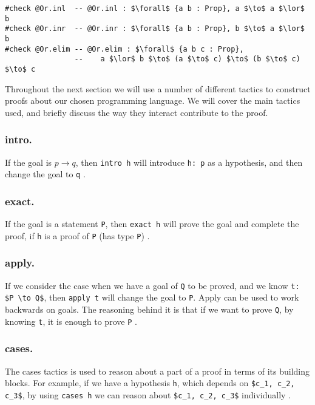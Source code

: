 \documentclass[runningheads]{llncs}
\newcommand{\cc}{\lstinline[mathescape]}
\begin{document}
\begin{lstlisting}[mathescape,
    caption={Useful definitions to better understand examples \ref{lst:or_elim}
    and \ref{lst:or_elim_tactic}.}]
#check @Or.inl  -- @Or.inl : $\forall$ {a b : Prop}, a $\to$ a $\lor$ b
#check @Or.inr  -- @Or.inr : $\forall$ {a b : Prop}, b $\to$ a $\lor$ b
#check @Or.elim -- @Or.elim : $\forall$ {a b c : Prop}, 
                --    a $\lor$ b $\to$ (a $\to$ c) $\to$ (b $\to$ c) $\to$ c
\end{lstlisting}

Throughout the next section we will use a number of different tactics to
construct proofs about our chosen programming language. We will cover the main
tactics used, and briefly discuss the way they interact contribute to the
proof.

\vspace{-3mm}

\subsubsection{intro.} If the goal is $p \to q$, then \lstinline{intro h} will introduce \lstinline{h: p} as a hypothesis, and then change the goal to \lstinline{q} \cite{natural}.
\vspace{-3mm}

\subsubsection{exact.} If the goal is a statement \lstinline{P}, then
\lstinline{exact h} will prove the goal and complete the proof, if
\lstinline{h} is a proof of \lstinline{P} (has type \lstinline{P})
\cite{natural}.
\vspace{-3mm}

\subsubsection{apply.} If we consider the case when we have a goal of \cc{Q} to
be proved, and we know \cc{t: $P \to Q$}, then \cc{apply t} will change the
goal to \cc{P}. Apply can be used to work backwards on goals. The reasoning
behind it is that if we want to prove \cc{Q}, by knowing \cc{t}, it is enough
to prove \cc{P} \cite{natural}.
\vspace{-3mm}

\subsubsection{cases.} The cases tactics is used to reason about a part of a proof in terms of its building blocks. For example, if we have a hypothesis
\cc{h}, which depends on \cc{$c_1, c_2, c_3$}, by using \cc{cases h} we can
reason about \cc{$c_1, c_2, c_3$} individually \cite{natural}.
\vspace{-3mm}
\end{document}
